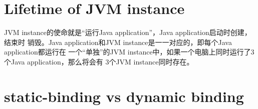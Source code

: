 \documentclass[a4paper,11pt]{article}
\begin{document}
\section[Lifetime of JVM instance]{Lifetime of JVM instance}
JVM instance的使命就是“运行Java application”，Java application启动时创建，结束时
销毁。Java application和JVM instance是一一对应的，即每个Java application都运行在
一个“单独”的JVM instance中，如果一个电脑上同时运行了3个Java application，那么将会有
3个JVM instance同时存在。



\section[static-binding vs dynamic binding]{static-binding vs dynamic binding}


\end{document}
